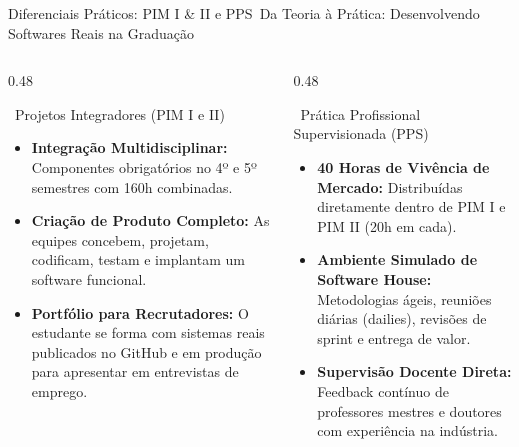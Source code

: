 
\begin{frame}{Diferenciais Práticos: PIM I \& II e PPS}{\faTools\ Da Teoria à Prática: Desenvolvendo Softwares Reais na Graduação}
  \begin{columns}[t]
    \begin{column}{0.48\textwidth}
      \begin{bluecard}{\faLayerGroup\ Projetos Integradores (PIM I e II)}
        \begin{itemize}\setlength{\itemsep}{0.35em}\footnotesize
          \item \textbf{Integração Multidisciplinar:} Componentes obrigatórios no 4º e 5º semestres com 160h combinadas.
          \item \textbf{Criação de Produto Completo:} As equipes concebem, projetam, codificam, testam e implantam um software funcional.
          \item \textbf{Portfólio para Recrutadores:} O estudante se forma com sistemas reais publicados no GitHub e em produção para apresentar em entrevistas de emprego.
        \end{itemize}
      \end{bluecard}
    \end{column}
    
    \begin{column}{0.48\textwidth}
      \begin{greencard}{\faUserCheck\ Prática Profissional Supervisionada (PPS)}
        \begin{itemize}\setlength{\itemsep}{0.35em}\footnotesize
          \item \textbf{40 Horas de Vivência de Mercado:} Distribuídas diretamente dentro de PIM I e PIM II (20h em cada).
          \item \textbf{Ambiente Simulado de Software House:} Metodologias ágeis, reuniões diárias (dailies), revisões de sprint e entrega de valor.
          \item \textbf{Supervisão Docente Direta:} Feedback contínuo de professores mestres e doutores com experiência na indústria.
        \end{itemize}
      \end{greencard}
    \end{column}
  \end{columns}
\end{frame}

